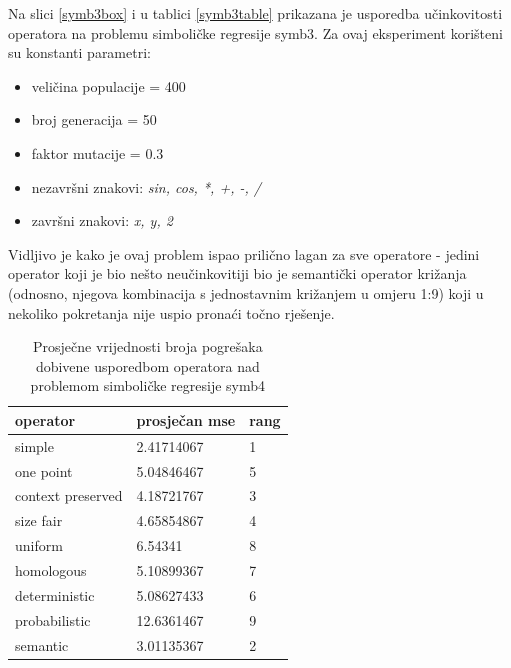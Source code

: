 Na slici \ref{symb3box} i u tablici \ref{symb3table} prikazana je usporedba učinkovitosti operatora na problemu simboličke regresije symb3. Za ovaj eksperiment korišteni su konstanti parametri:
\begin{itemize}
\item{veličina populacije = 400}
\item{broj generacija = 50}
\item{faktor mutacije = 0.3}
\item{nezavršni znakovi: \textit{sin, cos, *, +, -, /}}
\item{završni znakovi: \textit{x, y, 2}}
\end{itemize} 

Vidljivo je kako je ovaj problem ispao prilično lagan za sve operatore - jedini operator koji je bio nešto neučinkovitiji bio je semantički operator križanja (odnosno, njegova kombinacija s jednostavnim križanjem u omjeru 1:9) koji u nekoliko pokretanja nije uspio pronaći točno rješenje.



\begin{table}[H]
 	\centering

    \begin{tabular}{| l | l | l |}
    \hline
    \textbf{operator} & \textbf{prosječan mse} & \textbf{rang}\\ \hline
    simple & 2.41714067 & 1\\ \hline
    one point & 5.04846467 & 5\\ \hline
    context preserved & 4.18721767 & 3\\ \hline
    size fair & 4.65854867 & 4\\ \hline
    uniform & 6.54341 & 8\\ \hline
    homologous & 5.10899367 & 7\\ \hline
    deterministic & 5.08627433 & 6\\ \hline
    probabilistic & 12.6361467 & 9\\ \hline
    semantic & 3.01135367 & 2\\ \hline
    \end{tabular}
    
    \caption{Prosječne vrijednosti broja pogrešaka dobivene usporedbom operatora nad problemom simboličke regresije symb4}
    \label{symb4table}
\end{table}

